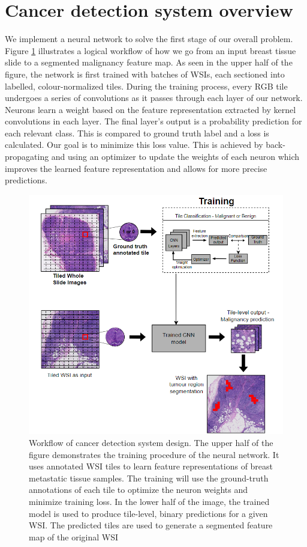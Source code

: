 \documentclass{l4proj}
\begin{document}
\section{Cancer detection system overview} \label{sec:detection-overview-design}
We implement a neural network to solve the first stage of our overall problem. Figure \ref{fig:sys-overview} illustrates a logical workflow of how we go from an input breast tissue slide to a segmented malignancy feature map. As seen in the upper half of the figure, the network is first trained with batches of WSIs, each sectioned into labelled, colour-normalized tiles. During the training process, every RGB tile undergoes a series of convolutions as it passes through each layer of our network. Neurons learn a weight based on the feature representation extracted by kernel convolutions in each layer. The final layer's output is a probability prediction for each relevant class. This is compared to ground truth label and a loss is calculated. Our goal is to minimize this loss value. This is achieved by back-propagating and using an optimizer to update the weights of each neuron which improves the learned feature representation and allows for more precise predictions. 

\begin{figure}[h]
    \centering
    \includegraphics[scale=0.65]{images/system-overview-1.png}
    \caption{Workflow of cancer detection system design. The upper half of the figure demonstrates the training procedure of the neural network. It uses annotated WSI tiles to learn feature representations of breast metastatic tissue samples. The training will use the ground-truth annotations of each tile to optimize the neuron weights and minimize training loss. In the lower half of the image, the trained model is used to produce tile-level, binary predictions for a given WSI. The predicted tiles are used to generate a segmented feature map of the original WSI}
    \label{fig:sys-overview}
\end{figure}
\end{document}
